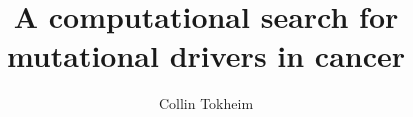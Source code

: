 \documentclass[12pt,oneside,final]{thesis}
\theoremstyle{definition}
\theoremstyle{remark}
\theoremstyle{remark}
\begin{document}
\title{A computational search for mutational drivers in cancer}
\author{Collin Tokheim}
\dissertation
\doctorphilosophy
\copyrightnotice












\appendix








\end{document}
